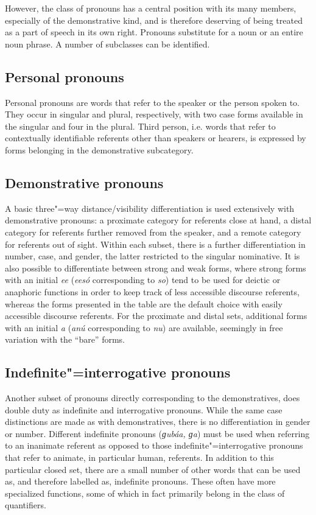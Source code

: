 However, the class of pronouns has a central position with its many members, especially of the demonstrative kind, and is therefore deserving of being treated as a part of speech in its own right. Pronouns substitute for a noun or an entire noun phrase. A number of subclasses can be identified.


\subsection{Personal pronouns}
\label{subsec:3b-6-1}
Personal pronouns are words that refer to the speaker or the person spoken to. They occur in singular and plural, respectively, with two case forms available in the singular and four in the plural. Third person, i.e. words that refer to contextually identifiable referents other than speakers or hearers, is expressed by forms belonging in the demonstrative subcategory.


\subsection{Demonstrative pronouns}
\label{subsec:3b-6-2}
A basic three"=way distance/visibility differentiation is used extensively with demonstrative pronouns: a proximate category for referents close at hand, a distal category for referents further removed from the speaker, and a remote category for referents out of sight. Within each subset, there is a further differentiation in number, case, and gender, the latter restricted to the singular nominative. It is also possible to differentiate between strong and weak forms, where strong forms with an initial \textit{ee} (\textit{eesó} corresponding to \textit{so}) tend to be used for deictic or anaphoric functions in order to keep track of less accessible discourse referents, whereas the forms presented in the table are the default choice with easily accessible discourse referents. For the proximate and distal sets, additional forms with an initial \textit{a} (\textit{anú} corresponding to \textit{nu}) are available, seemingly in free variation with the ``bare'' forms.


\subsection{Indefinite"=interrogative pronouns}
\label{subsec:3b-6-3}
Another subset of pronouns directly corresponding to the demonstratives, does double duty as indefinite and interrogative pronouns. While the same case distinctions are made as with demonstratives, there is no differentiation in gender or number. Different indefinite pronouns (\textit{ɡubáa, ɡa}) must be used when referring to an inanimate referent as opposed to those indefinite"=interrogative pronouns that refer to animate, in particular human, referents. In addition to this particular closed set, there are a small number of other words that can be used as, and therefore labelled as, indefinite pronouns. These often have more specialized functions, some of which in fact primarily belong in the class of quantifiers.


